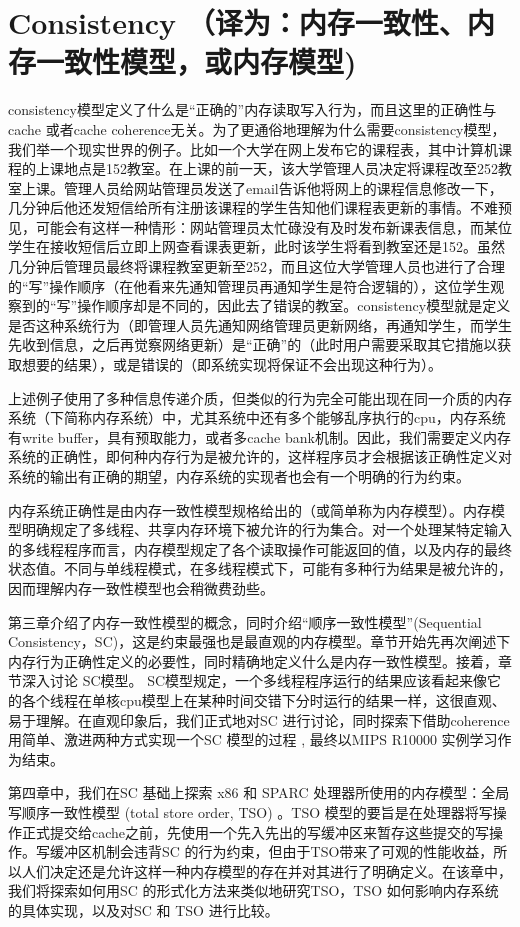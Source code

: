 \documentclass[UTF-8]{ctexbook}
\begin{document}
\section{Consistency （译为：内存一致性、内存一致性模型，或内存模型) }
consistency模型定义了什么是“正确的”内存读取写入行为，而且这里的正确性与cache 或者cache coherence无关。为了更通俗地理解为什么需要consistency模型，我们举一个现实世界的例子。比如一个大学在网上发布它的课程表，其中计算机课程的上课地点是152教室。在上课的前一天，该大学管理人员决定将课程改至252教室上课。管理人员给网站管理员发送了email告诉他将网上的课程信息修改一下，几分钟后他还发短信给所有注册该课程的学生告知他们课程表更新的事情。不难预见，可能会有这样一种情形：网站管理员太忙碌没有及时发布新课表信息，而某位学生在接收短信后立即上网查看课表更新，此时该学生将看到教室还是152。虽然几分钟后管理员最终将课程教室更新至252，而且这位大学管理人员也进行了合理的“写”操作顺序（在他看来先通知管理员再通知学生是符合逻辑的），这位学生观察到的“写”操作顺序却是不同的，因此去了错误的教室。consistency模型就是定义是否这种系统行为（即管理人员先通知网络管理员更新网络，再通知学生，而学生先收到信息，之后再觉察网络更新）是“正确”的（此时用户需要采取其它措施以获取想要的结果），或是错误的（即系统实现将保证不会出现这种行为）。
\par 上述例子使用了多种信息传递介质，但类似的行为完全可能出现在同一介质的内存系统（下简称内存系统）中，尤其系统中还有多个能够乱序执行的cpu，内存系统有write buffer，具有预取能力，或者多cache bank机制。因此，我们需要定义内存系统的正确性，即何种内存行为是被允许的，这样程序员才会根据该正确性定义对系统的输出有正确的期望，内存系统的实现者也会有一个明确的行为约束。
\par 内存系统正确性是由内存一致性模型规格给出的（或简单称为内存模型）。内存模型明确规定了多线程、共享内存环境下被允许的行为集合。对一个处理某特定输入的多线程程序而言，内存模型规定了各个读取操作可能返回的值，以及内存的最终状态值。不同与单线程模式，在多线程模式下，可能有多种行为结果是被允许的，因而理解内存一致性模型也会稍微费劲些。
\par 第三章介绍了内存一致性模型的概念，同时介绍“顺序一致性模型”(Sequential Consistency，SC)，这是约束最强也是最直观的内存模型。章节开始先再次阐述下内存行为正确性定义的必要性，同时精确地定义什么是内存一致性模型。接着，章节深入讨论 SC模型。 SC模型规定，一个多线程程序运行的结果应该看起来像它的各个线程在单核cpu模型上在某种时间交错下分时运行的结果一样，这很直观、易于理解。在直观印象后，我们正式地对SC 进行讨论，同时探索下借助coherence用简单、激进两种方式实现一个SC 模型的过程 , 最终以MIPS R10000 实例学习作为结束。
\par 第四章中，我们在SC 基础上探索 x86 和 SPARC 处理器所使用的内存模型：全局写顺序一致性模型 (total store order, TSO) 。TSO 模型的要旨是在处理器将写操作正式提交给cache之前，先使用一个先入先出的写缓冲区来暂存这些提交的写操作。写缓冲区机制会违背SC 的行为约束，但由于TSO带来了可观的性能收益，所以人们决定还是允许这样一种内存模型的存在并对其进行了明确定义。在该章中，我们将探索如何用SC 的形式化方法来类似地研究TSO，TSO 如何影响内存系统的具体实现，以及对SC 和 TSO 进行比较。
\end{document}
